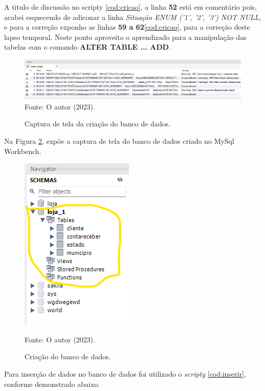 

\par A titulo de discussão no scripty \ref{cod:cricao}, a linha \textbf{52} está em comentário pois, acabei esquecendo de adiconar a linha \textit{Situação ENUM ('1', '2', '3') NOT NULL}, e para a correção exponho as linhas \textbf{59 a 62}\ref{cod:cricao}, para a correção deste lapso temporal. Neste ponto aproveito o aprendizado para a manipulação das tabelas com o comando \textbf{ALTER TABLE ... ADD}.

 \begin{figure}[h!]
 \caption{Captura de tela da criação do banco de dados.}
 \includegraphics[width=\textwidth]{figure/fragmento.png}
 \label{fig:fragmento}
 {\fontsize{10pt}{\baselineskip}\selectfont
 Fonte: O autor (2023).}
 \end{figure}
\par Na Figura \ref{fig:banco}, expõe a captura de tela do banco de dados criado no MySql Workbench.
 \begin{figure}[h!]
 \caption{Criação do banco de dados.}
 \begin{center}
    \includegraphics[scale=.7]{figure/banco.png}
 \end{center}
 \label{fig:banco}
 {\fontsize{10pt}{\baselineskip}\selectfont
 Fonte: O autor (2023).}
 \end{figure}
\par Para inserção de dados no banco de dados foi utilizado o \textit{scripty} \autoref{cod:inserir}, conforme demonstrado abaixo.


